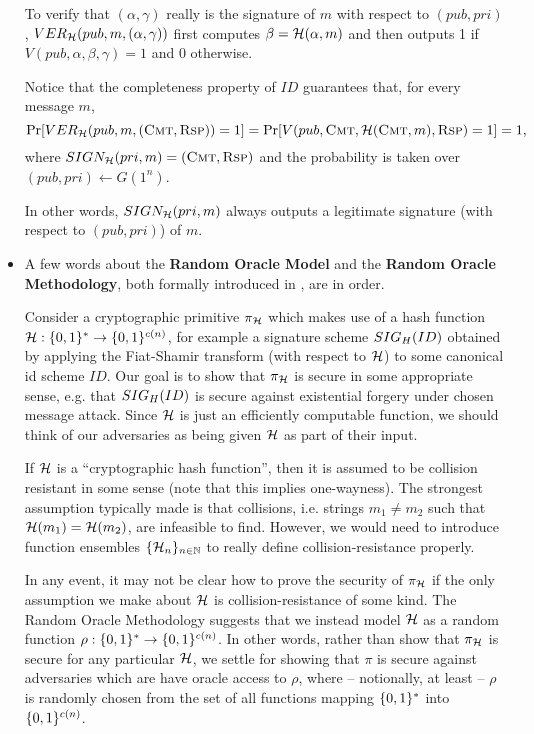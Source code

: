 \documentclass[12pt,twoside]{article}
\begin{document}
\begin{itemize}
To verify that $(\alpha,\gamma)$ really is the signature of $m$ with respect
to $(pub,pri)$, $VER_\fanh(pub,m,(\alpha,\gamma))$ first computes 
$\beta = \fanh(\alpha,m)$ and then outputs 1 if 
$V(pub,\alpha,\beta,\gamma) = 1$ and 0 otherwise.

Notice that the completeness property of $ID$ guarantees that, for every 
message $m$,
\[
\text{Pr}[VER_\fanh(pub,m,(\textsc{Cmt},\textsc{Rsp}))= 1] =
\text{Pr}[V(pub,\textsc{Cmt},\fanh(\textsc{Cmt},m),\textsc{Rsp}) = 1] = 1,
\]
where $SIGN_\fanh(pri,m) = (\textsc{Cmt},\textsc{Rsp})$ and the probability is
taken over $(pub,pri) \gets G(1^n)$. 

In other words, $SIGN_\fanh(pri,m)$ always outputs a legitimate signature 
(with respect to $(pub,pri)$) of $m$.

\item A few words about the {\bf Random Oracle Model} and the
{\bf Random Oracle Methodology}, both formally introduced in
\cite{bellare:rompractical}, are in order. 

Consider a cryptographic primitive $\pi_\fanh$ which makes use of a hash 
function $\fanh: \strs{*} \to \strs{c(n)}$, for example a signature scheme 
$\fs{ID}{H}$ obtained by applying the Fiat-Shamir transform (with respect to
$\fanh$) to some canonical id scheme $ID$. Our goal is to show that $\pi_\fanh$
is secure in some appropriate sense, e.g. that $\fs{ID}{H}$ is secure 
against existential forgery under chosen message attack. Since $\fanh$ is just
an efficiently computable function, we should think of our adversaries as
being given $\fanh$ as part of their input.

If $\fanh$ is a ``cryptographic hash function'', then it is assumed to be 
collision resistant in some sense (note that this implies one-wayness). The 
strongest assumption typically made is that collisions, i.e. strings 
$m_1 \neq m_2$ such that $\fanh(m_1) = \fanh(m_2)$, are infeasible to find. 
However, we would need to introduce function ensembles $\ens{\fanh}{n}$ to 
really define collision-resistance properly.

In any event, it may not be clear how to prove the security of $\pi_\fanh$
if the only assumption we make about $\fanh$ is collision-resistance of some
kind. The Random Oracle Methodology suggests that we instead model $\fanh$ as 
a random function $\rho: \strs{*} \to \strs{c(n)}$. In other words, rather 
than show that $\pi_\fanh$ is secure for any particular $\fanh$, we settle for
showing that $\pi$ is secure against adversaries which are have oracle access 
to $\rho$, where -- notionally, at least -- $\rho$ is randomly chosen from the 
set of all functions mapping $\strs{*}$ into $\strs{c(n)}$. 


\end{itemize}
\end{document}
